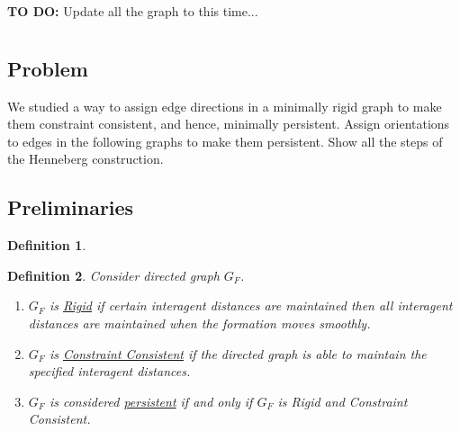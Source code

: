 \documentclass[]{article}
\numberwithin{equation}{section}
\newtheorem{definition}{Definition}
\begin{document}



\textbf{TO DO:} 
Update all the graph to this time...


\newpage
\section{}
\subsection*{Problem}
We studied a way to assign edge directions in a minimally rigid graph to make them constraint consistent, and hence, minimally persistent. 
Assign orientations to edges in the following graphs to make them persistent. 
Show all the steps of the Henneberg construction.





\subsection*{Preliminaries}
\begin{definition}
    
\end{definition}
\begin{definition} \label{def:persistent}
    Consider directed graph $G_F$. 
    \begin{enumerate}
        \item $G_F$ is \emph{\underline{Rigid}} if certain interagent distances are maintained then all interagent distances are maintained when the formation moves smoothly.
        \item $G_F$ is \emph{\underline{Constraint Consistent}} if the directed graph is able to maintain the specified interagent distances.
        \item $G_F$ is considered \emph{\underline{persistent}} if and only if $G_F$ is Rigid and Constraint Consistent.
    \end{enumerate}
\end{definition}
\end{document}

